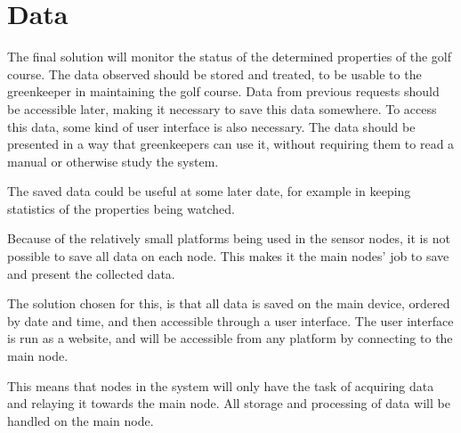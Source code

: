 \section{Data}
The final solution will monitor the status of the determined properties of the golf course. The data observed should be stored and treated, to be usable to the greenkeeper in maintaining the golf course. Data from previous requests should be accessible later, making it necessary to save this data somewhere. To access this data, some kind of user interface is also necessary. The data should be presented in a way that greenkeepers can use it, without requiring them to read a manual or otherwise study the system. 

The saved data could be useful at some later date, for example in keeping  statistics of the properties being watched.

Because of the relatively small platforms being used in the sensor nodes, it is not possible to save all data on each node. This makes it the main nodes' job to save and present the collected data.

The solution chosen for this, is that all data is saved on the main device, ordered by date and time, and then accessible through a user interface. The user interface is run as a website, and will be accessible from any platform by connecting to the main node.

This means that nodes in the system will only have the task of acquiring data and relaying it towards the main node. All storage and processing of data will be handled on the main node.